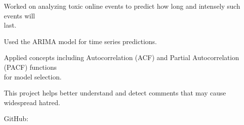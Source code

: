 \begin{resume_list}
  \item Worked on analyzing toxic online events to predict how long and intensely such events will \\
  last.
  \item Used the ARIMA model for time series predictions.
  \item Applied concepts including Autocorrelation (ACF) and Partial Autocorrelation (PACF) functions \\
  for model selection.
  \item This project helps better understand and detect comments that may cause widespread hatred.
  \item GitHub: 
\end{resume_list}
